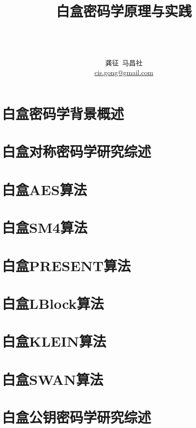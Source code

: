 \documentclass[UTF8]{ctexbook}
\title{白盒密码学原理与实践}
\date{}
\author{~\\
	~\\
	~\\
	龚征~马昌社\\
\url{cis.gong@gmail.com}}
\begin{document}
\maketitle

\tableofcontents
\listoffigures
\listoftables



\chapter{白盒密码学背景概述}
\label{chapter:Background}
%

\chapter{白盒对称密码学研究综述}
\label{chapter:WBSymmetricKeyIntro}
%

\chapter{白盒AES算法}
\label{chapter:WBAES}
%


\chapter{白盒SM4算法}
\label{chapter:WBSM4}
%


\chapter{白盒PRESENT算法}

\chapter{白盒LBlock算法}

\chapter{白盒KLEIN算法}

\chapter{白盒SWAN算法}

\chapter{白盒公钥密码学研究综述}
\label{chapter:WBPBkeyIntro}
%
\end{document}
